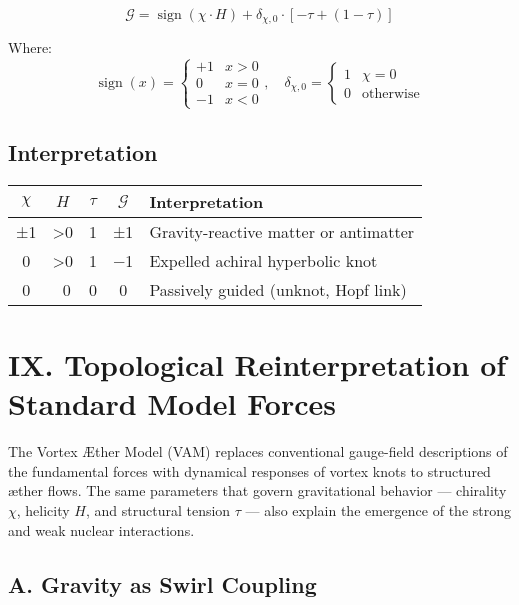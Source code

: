 \documentclass[12pt]{article}
\begin{document}
\[
\boxed{\mathcal{G} = \operatorname{sign}(\chi \cdot H) + \delta_{\chi, 0} \cdot \left[ -\tau + (1 - \tau) \right]}
\]

Where:
\[ \operatorname{sign}(x) = \begin{cases}  +1 & x > 0 \\
                                            0 & x = 0 \\
                                           -1 & x < 0
                            \end{cases}, \quad \delta_{\chi,0} = \begin{cases} 1 & \chi = 0 \\
                                                                               0 & \text{otherwise}
                                                                 \end{cases}
\]

\subsection*{Interpretation}

\begin{center}
\begin{tabular}{|c|c|c|c|l|}
\hline
\( \chi \) & \( H \) & \( \tau \) & \( \mathcal{G} \) & Interpretation \\
\hline
±1 & >0 & 1 & ±1 & Gravity-reactive matter or antimatter \\
0 & >0 & 1 & −1 & Expelled achiral hyperbolic knot \\
0 & ~0 & 0 & 0 & Passively guided (unknot, Hopf link) \\
\hline
\end{tabular}
\end{center}



\section*{IX. Topological Reinterpretation of Standard Model Forces}

The Vortex Æther Model (VAM) replaces conventional gauge-field descriptions of the fundamental forces with dynamical responses of vortex knots to structured æther flows. The same parameters that govern gravitational behavior — chirality \( \chi \), helicity \( H \), and structural tension \( \tau \) — also explain the emergence of the strong and weak nuclear interactions.

\subsection*{A. Gravity as Swirl Coupling}
\end{document}
